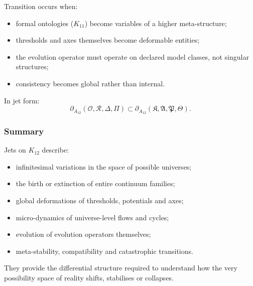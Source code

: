 Transition occurs when:
\begin{itemize}
    \item formal ontologies ($K_{11}$) become variables of a higher
          meta-structure;
    \item thresholds and axes themselves become deformable entities;
    \item the evolution operator must operate on declared model classes,
          not singular structures;
    \item consistency becomes global rather than internal.
\end{itemize}

In jet form:
\[
\partial_{A_{12}}(\mathcal{O},\mathcal{R},\Delta,\Pi)
\subset
\partial_{A_{12}}(\mathfrak{K},\mathfrak{A},\mathfrak{P},\mathfrak{\Theta}).
\]


\subsubsection{Summary}

Jets on $K_{12}$ describe:
\begin{itemize}
    \item infinitesimal variations in the space of possible universes;
    \item the birth or extinction of entire continuum families;
    \item global deformations of thresholds, potentials and axes;
    \item micro-dynamics of universe-level flows and cycles;
    \item evolution of evolution operators themselves;
    \item meta-stability, compatibility and catastrophic transitions.
\end{itemize}

They provide the differential structure required to understand how the
very possibility space of reality shifts, stabilises or collapses.
